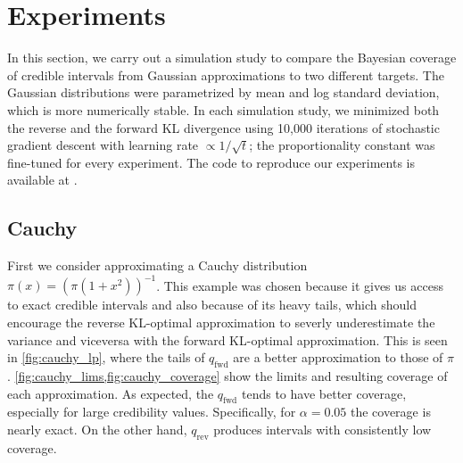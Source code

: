 \section{Experiments} \label{sec:experiments}

In this section,
we carry out a simulation study to compare
the Bayesian coverage of credible intervals
from Gaussian approximations to two different targets.
The Gaussian distributions were parametrized by mean
and log standard deviation,
which is more numerically stable.
In each simulation study,
we minimized both the reverse and the forward KL divergence
using 10,000 iterations of stochastic gradient descent
with learning rate $\propto 1/\sqrt{t}$;
the proportionality constant was fine-tuned for every experiment.
The code to reproduce our experiments is available at .


\subsection{Cauchy} \label{subsec:cauchy}

First we consider approximating a Cauchy distribution
$\pi(x)=(\pi(1+x^2))^{-1}$.
This example was chosen because it gives us access to exact
credible intervals and also because of its heavy tails,
which should encourage the reverse KL-optimal
approximation to severly underestimate the variance
and viceversa with the forward KL-optimal approximation.
This is seen in \cref{fig:cauchy_lp},
where the tails of $q_\mathrm{fwd}$ are a better
approximation to those of $\pi$.
\cref{fig:cauchy_lims,fig:cauchy_coverage}
show the limits and resulting coverage of each approximation.
As expected, the $q_\mathrm{fwd}$ tends to have better coverage,
especially for large credibility values.
Specifically, for $\alpha=0.05$
the coverage is nearly exact.
On the other hand, $q_\mathrm{rev}$ produces
intervals with consistently low coverage.

